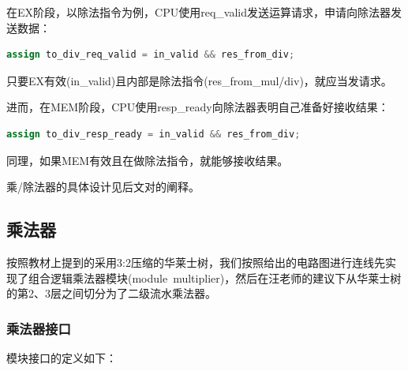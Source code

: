 \documentclass[11pt]{article}
\begin{document}
在EX阶段，以除法指令为例，CPU使用req_valid发送运算请求，申请向除法器发送数据：

\begin{lstlisting}[language=Verilog, caption={CPU的除法运算请求}]
assign to_div_req_valid = in_valid && res_from_div;
\end{lstlisting}
只要EX有效(in_valid)且内部是除法指令(res_from_mul/div)，就应当发请求。

进而，在MEM阶段，CPU使用resp_ready向除法器表明自己准备好接收结果：
\begin{lstlisting}[language=Verilog, caption={CPU的除法运算接收准备}]
assign to_div_resp_ready = in_valid && res_from_div;
\end{lstlisting}
同理，如果MEM有效且在做除法指令，就能够接收结果。


乘/除法器的具体设计见后文对的阐释。




\subsection{乘法器}

按照教材上提到的采用3:2压缩的华莱士树，我们按照给出的电路图进行连线先实现了组合逻辑乘法器模块(module\  multiplier)，然后在汪老师的建议下从华莱士树的第2、3层之间切分为了二级流水乘法器。

\subsubsection{乘法器接口}

模块接口的定义如下：
\end{document}
